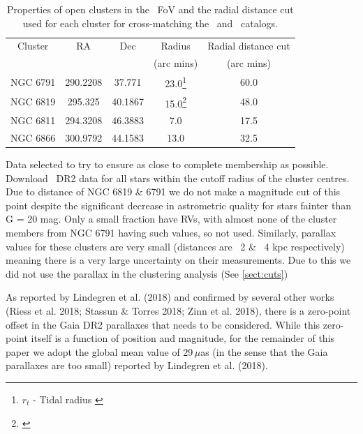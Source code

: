 \vspace{3pt}

\begin{table}[h]
    \centering
    \setlength\tabcolsep{10pt}
    \begin{tabular}{ccccc}
        \hline
        Cluster     & RA        & Dec       & Radius    & Radial distance cut \\
                    &           &           & (arc mins)& (arc mins) \\
        \hline
        \hline
        NGC 6791    & 290.2208  & 37.771    & 23.0\footnote[2]{$r_t$ - Tidal radius \citep{platais_new_2011}} & 60.0\\
        NGC 6819    & 295.325   & 40.1867   & 15.0\footnote[2]{\citet{yang_wiyn_2013}} & 48.0\\
        NGC 6811    & 294.3208  & 46.3883   & 7.0               & 17.5\\
        NGC 6866    & 300.9792  & 44.1583   & 13.0              & 32.5\\
        \hline
    \end{tabular}
    \caption{Properties of open clusters in the \Kepler~FoV and the radial distance cut used for each cluster for cross-matching the \Gaia~and \Kepler~catalogs.}
    \label{tab:cluster_selection}
\end{table}

Data selected to try to ensure as close to complete membership as possible. Download \Gaia~DR2 data for all stars within the cutoff radius of the cluster centres. Due to distance of NGC 6819 \& 6791 we do not make a magnitude cut of this point despite the significant decrease in astrometric quality for stars fainter than G = 20 mag. Only a small fraction have RVs, with almost none of the cluster members from NGC 6791 having such values, so not used. Similarly, parallax values for these clusters are very small (distances are ~2 \& ~4 kpc respectively) meaning there is a very large uncertainty on their measurements. Due to this we did not use the parallax in the clustering analysis (See \cref{sect:cuts})

As reported by Lindegren et al. (2018) and confirmed
by several other works (Riess et al. 2018; Stassun \&
Torres 2018; Zinn et al. 2018), there is a zero-point offset
in the Gaia DR2 parallaxes that needs to be considered.
While this zero-point itself is a function of position and
magnitude, for the remainder of this paper we adopt the
global mean value of 29\,$\mu$as (in the sense that the Gaia
parallaxes are too small) reported by Lindegren et al.
(2018).

